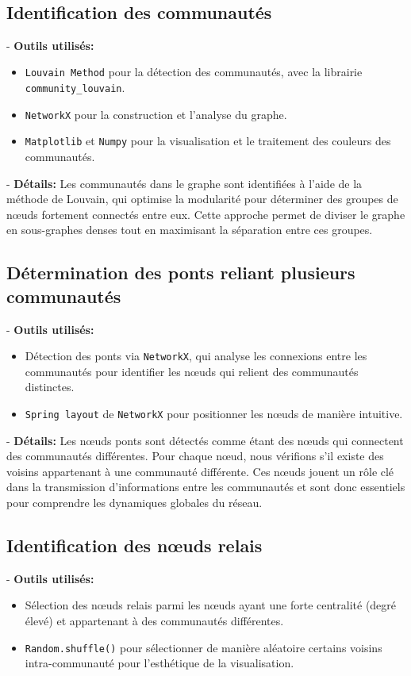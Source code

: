 \documentclass[a4paper, 12pt, twoside]{article}
\begin{document}
        \\
\newpage
    \subsection{Identification des communautés}
    - \textbf{Outils utilisés:}
    \begin{itemize}
        \item \texttt{Louvain Method} pour la détection des communautés, avec la librairie \texttt{community_louvain}.
        \item \texttt{NetworkX} pour la construction et l'analyse du graphe.
        \item \texttt{Matplotlib} et \texttt{Numpy} pour la visualisation et le traitement des couleurs des communautés.
    \end{itemize}
    
    - \textbf{Détails:}
    Les communautés dans le graphe sont identifiées à l'aide de la méthode de Louvain, qui optimise la modularité pour déterminer des groupes de nœuds fortement connectés entre eux. Cette approche permet de diviser le graphe en sous-graphes denses tout en maximisant la séparation entre ces groupes.

\subsection{Détermination des ponts reliant plusieurs communautés}
    - \textbf{Outils utilisés:}
    \begin{itemize}
        \item Détection des ponts via \texttt{NetworkX}, qui analyse les connexions entre les communautés pour identifier les nœuds qui relient des communautés distinctes.
        \item \texttt{Spring layout} de \texttt{NetworkX} pour positionner les nœuds de manière intuitive.
    \end{itemize}
    
    - \textbf{Détails:}
    Les nœuds ponts sont détectés comme étant des nœuds qui connectent des communautés différentes. Pour chaque nœud, nous vérifions s'il existe des voisins appartenant à une communauté différente. Ces nœuds jouent un rôle clé dans la transmission d'informations entre les communautés et sont donc essentiels pour comprendre les dynamiques globales du réseau.

\subsection{Identification des nœuds relais}
    - \textbf{Outils utilisés:}
    \begin{itemize}
        \item Sélection des nœuds relais parmi les nœuds ayant une forte centralité (degré élevé) et appartenant à des communautés différentes.
        \item \texttt{Random.shuffle()} pour sélectionner de manière aléatoire certains voisins intra-communauté pour l'esthétique de la visualisation.
    \end{itemize}
    
\end{document}
